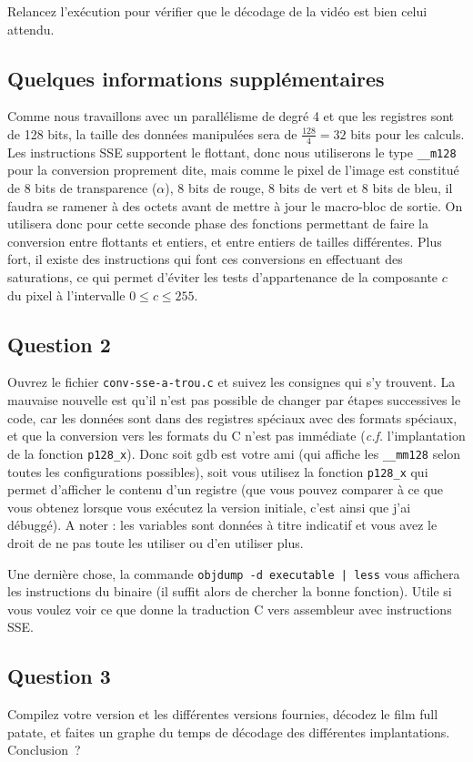 \documentclass[a4paper,12pt]{article}
\begin{document}
Relancez l'exécution pour vérifier que le décodage de la vidéo est bien celui attendu.

\subsection*{Quelques informations supplémentaires}
Comme nous travaillons avec un parallélisme de degré 4 et que les registres sont de 128 bits, la taille des données manipulées sera de $\frac{128}{4} = 32$ bits pour les calculs.
Les instructions SSE supportent le flottant, donc nous utiliserons le type \lstinline{__m128} pour la conversion proprement dite, mais comme le pixel de l'image est constitué de 8 bits de transparence ($\alpha$), 8 bits de rouge, 8 bits de vert et 8 bits de bleu, il faudra se ramener à des octets avant de mettre à jour le macro-bloc de sortie.
On utilisera donc pour cette seconde phase des fonctions permettant de faire la conversion entre flottants et entiers, et entre entiers de tailles différentes.
Plus fort, il existe des instructions qui font ces conversions en effectuant des saturations, ce qui permet d'éviter les tests d'appartenance de la composante $c$ du pixel à l'intervalle $0 \leq c \leq 255$.


\subsection*{Question 2}
Ouvrez le fichier \lstinline[language=bash]{conv-sse-a-trou.c} et suivez les consignes qui s'y trouvent.
La mauvaise nouvelle est qu'il n'est pas possible de changer par étapes successives le code, car les données sont dans des registres spéciaux avec des formats spéciaux, et que la conversion vers les formats du C n'est pas immédiate (\emph{c.f.} l'implantation de la fonction \lstinline{p128_x}).
Donc soit gdb est votre ami (qui affiche les \lstinline{__mm128} selon toutes les configurations possibles), soit vous utilisez la fonction \lstinline{p128_x} qui permet d'afficher le contenu d'un registre (que vous pouvez comparer à ce que vous obtenez lorsque vous exécutez la version initiale, c'est ainsi que j'ai débuggé). A noter : les variables sont données à titre indicatif et vous avez le droit de ne pas toute les utiliser ou d'en utiliser plus.

Une dernière chose, la commande \lstinline{objdump -d executable | less} vous affichera les instructions du binaire (il suffit alors de chercher la bonne fonction). Utile si vous voulez voir ce que donne la traduction C vers assembleur avec instructions SSE.

\subsection*{Question 3}
Compilez votre version et les différentes versions fournies, décodez le film full patate, et faites un graphe du temps de décodage des différentes implantations.
Conclusion~?
\end{document}
